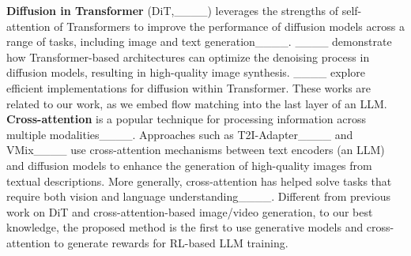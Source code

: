 \textbf{Diffusion in Transformer} (DiT,____) leverages the strengths of self-attention of Transformers to improve the performance of diffusion models across a range of tasks, including image and text generation____. ____ demonstrate how Transformer-based architectures can optimize the denoising process in diffusion models, resulting in high-quality image synthesis. ____ explore efficient implementations for diffusion within Transformer. These works are related to our work, as we embed flow matching into the last layer of an LLM. \textbf{Cross-attention} is a popular technique for processing information across multiple modalities____. Approaches such as T2I-Adapter____ and VMix____ use cross-attention mechanisms between text encoders (an LLM) and diffusion models to enhance the generation of high-quality images from textual descriptions. More generally, cross-attention has helped solve tasks that require both vision and language understanding____.  Different from previous work on DiT and cross-attention-based image/video generation, to our best knowledge, the proposed method is the first to use generative models and cross-attention to generate rewards for RL-based LLM training.



